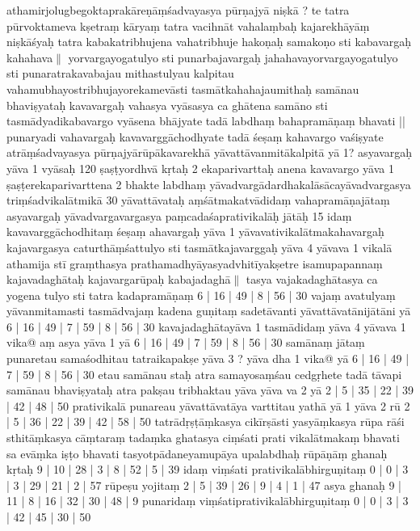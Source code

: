\documentclass[10pt]{article}
\begin{document}
athamirjolugbegoktaprakāreṇāṃśadvayasya pūrṇajyā niṣkā ? te tatra pūrvoktameva kṣetraṃ 
kāryaṃ tatra vacihnāt vahalaṃbaḥ kajarekhāyāṃ niṣkāśyaḥ tatra kabakatribhujena vahatribhuje hakoṇaḥ samakoṇo sti kabavargaḥ kahahava$\|$
yorvargayogatulyo sti punarbajavargaḥ jahahavayorvargayogatulyo sti 
punaratrakavabajau mithastulyau kalpitau vahamubhayostribhujayorekamevāsti tasmātkahahajaumithaḥ samānau bhaviṣyataḥ kavavargaḥ vahasya vyāsasya ca ghātena samāno sti tasmādyadikabavargo vyāsena bhājyate tadā labdhaṃ bahapramāṇaṃ bhavati || 
punaryadi vahavargaḥ kavavarggāchodhyate tadā śeṣaṃ kahavargo vaśiṣyate atrāṃśadvayasya pūrṇajyārūpākavarekhā 
yāvattāvanmitākalpitā yā 1? asyavargaḥ
 yāva 1 vyāsaḥ 120 ṣaṣṭyordhvā kṛtaḥ 2 ekaparivarttaḥ anena  kavavargo yāva 1 ṣaṣṭerekaparivarttena 2 bhakte labdhaṃ 
 yāvadvargādardhakalāsācayāvadvargasya triṃśadvikalātmikā 30 
 yāvattāvataḥ aṃśātmakatvādidaṃ vahapramāṇajātaṃ asyavargaḥ yāvadvargavargasya
paṃcadaśaprativikalāḥ jātāḥ 15 idaṃ kavavarggāchodhitaṃ śeṣaṃ ahavargaḥ yāva 1 yāvavativikalātmakahavargaḥ kajavargasya caturthāṃśattulyo sti tasmātkajavarggaḥ yāva 4 yāvava 1 
vikalā athamija stī graṃthasya prathamadhyāyasyadvhitīyakṣetre isamupapannaṃ kajavadaghātaḥ kajavargarūpaḥ 
kabajadaghā$\|$ 
tasya vajakadaghātasya ca yogena tulyo sti tatra kadapramāṇaṃ 6 | 16 | 49 | 8 | 56 | 30 vajaṃ avatulyaṃ 
yāvanmitamasti tasmādvajaṃ kadena guṇitaṃ sadetāvanti yāvattāvatānijātāni yā 6 | 16 | 49 | 7 | 59 | 8 | 56 | 30 kavajadaghātayāva 1 
tasmādidaṃ yāva 4 yāvava 1 vika@ aṃ asya yāva 1 yā 6 | 16 | 49 | 7 | 59 | 8 | 56 | 30 samānaṃ jātaṃ punaretau samaśodhitau tatraikapakṣe 
yāva 3 ? yāva dha 1 vika@ 
yā 6 | 16 | 49 | 7 | 59 | 8 | 56 | 30 etau samānau staḥ atra samayosaṃśau cedgṛhete tadā tāvapi 
samānau bhaviṣyataḥ atra pakṣau tribhaktau yāva 
yāva va 2 yā 2 | 5 | 35 | 22 | 39 | 42 | 48 | 50 prativikalā
punareau yāvattāvatāya varttitau yathā yā 1 
yāva 2 rū 2 | 5 | 36 | 22 | 39 | 42 | 58 | 50 
tatrādṛṣṭāṃkasya cikīrṣāsti yasyāṃkasya rūpa rāśi 
sthitāṃkasya cāṃtaraṃ tadaṃka ghatasya ciṃśati 
prati vikalātmakaṃ bhavati sa evāṃka iṣṭo bhavati tasyotpādaneyamupāya upalabdhaḥ rūpāṇāṃ ghanaḥ kṛtaḥ 9 | 10 | 28 | 3 | 8 | 52 | 5 | 39 
idaṃ viṃśati prativikalābhirguṇitaṃ 0 | 0 | 3 | 3 | 29 | 21 | 2 | 57 rūpeṣu yojitaṃ 2 | 5 | 39 | 26 | 9 | 4 | 1 | 47 asya ghanaḥ 9 | 11 | 8 | 16 | 32 | 30 | 48 | 9 punaridaṃ viṃśatiprativikalābhirguṇitaṃ 0 | 0 | 3 | 3 | 42 | 45 | 30 | 50 
\end{document}
